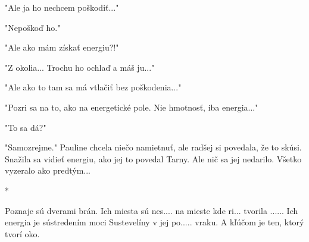 \documentclass{book}
\begin{document}
"$ $Ale ja ho nechcem poškodiť..."$ $ 

"$ $Nepoškoď ho."$ $ 

"$ $Ale ako mám získať energiu?!"$ $ 

"$ $Z okolia... Trochu ho ochlaď a máš ju..."$ $ 

"$ $Ale ako to tam sa má vtlačiť bez poškodenia..."$ $ 

"$ $Pozri sa na to, ako na energetické pole. Nie hmotnosť, iba energia..."$ $ 

"$ $To sa dá?"$ $ 

"$ $Samozrejme."$ $  Pauline chcela niečo namietnuť, ale radšej si povedala, že to skúsi. Snažila sa vidieť energiu, ako jej to povedal Tarny. Ale nič sa jej nedarilo. Všetko vyzeralo ako predtým...

\begin{center}

*

\end{center}

Poznaje sú dverami brán. Ich miesta sú nes.... na mieste kde ri... tvorila ...... Ich energia je sústredením moci Sustevelíny v jej po..... vraku. A kľúčom je ten, ktorý tvorí oko.
\end{document}
